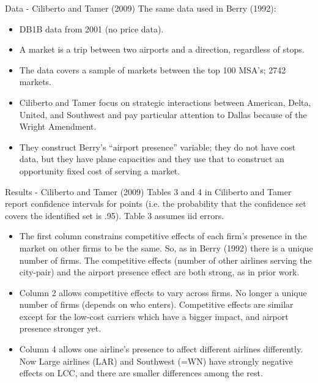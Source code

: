 \documentclass[aspectratio=169,11pt]{beamer}
\begin{document}
\begin{frame}{Data - Ciliberto and Tamer (2009)}
The same data used in Berry (1992):
\begin{itemize}
\item DB1B data from 2001 (no price data).  
\item A market is a trip between two airports and a direction, regardless of stops. 
\item The data covers a sample of markets between the top 100 MSA's; 2742 markets.   \item Ciliberto and Tamer focus on strategic interactions between American, Delta, United, and Southwest and pay particular attention to Dallas because of the Wright Amendment.  
\item They construct Berry's ``airport presence'' variable; they do not have cost data, but they have plane capacities and they use that to construct an opportunity fixed cost of serving a market.
\end{itemize}
\end{frame}
\begin{frame}{Results - Ciliberto and Tamer (2009)}
\small
Tables 3 and 4 in Ciliberto and Tamer report confidence intervals for points (i.e. the probability that the confidence set covers the identified set is .95). Table 3 assumes iid errors.  \\
\begin{itemize}
\item The first column constrains competitive effects of each firm's presence in the market on other firms to be the
same.  So, as in Berry (1992) there is a unique number of
firms. The competitive effects (number of other airlines 
serving the city-pair) and the airport presence effect are
both strong, as in prior work.
\item Column 2 allows competitive effects to vary across firms. No longer
a unique number of firms (depends on who enters). Competitive effects 
are similar except for the low-cost carriers
which have a bigger impact, and airport presence stronger yet.\\
\item Column 4 allows one airline's presence to affect different airlines differently. Now Large airlines (LAR) and Southwest (=WN) have strongly negative effects on LCC, and there
are smaller differences among the rest.
\end{itemize}
\end{frame}
\end{document}
